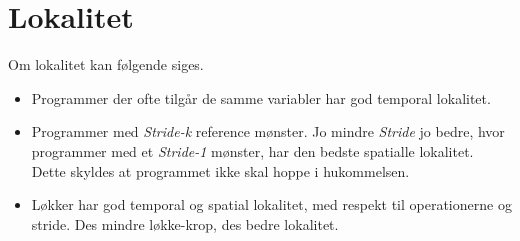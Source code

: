 \section{Lokalitet}
Om lokalitet kan følgende siges.
\begin{itemize}
    \item Programmer der ofte tilgår de samme variabler har god temporal lokalitet.
    \item Programmer med \textit{Stride-k} reference mønster. 
    Jo mindre \textit{Stride} jo bedre, hvor programmer med et \textit{Stride-1} mønster, har den bedste spatialle lokalitet.
    Dette skyldes at programmet ikke skal hoppe i hukommelsen.
    \item Løkker har god temporal og spatial lokalitet, med respekt til operationerne og stride.
    Des mindre løkke-krop, des bedre lokalitet.
\end{itemize}

